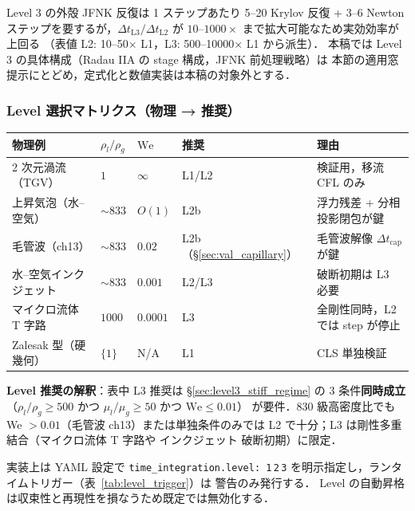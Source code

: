 Level 3 の外殻 JFNK 反復は 1 ステップあたり 5--20 Krylov 反復 + 3--6 Newton
ステップを要するが，$\Delta t_\text{L3}/\Delta t_\text{L2}$ が
$10\text{--}1000\times$ まで拡大可能なため実効効率が上回る
（表値 L2: 10--50$\times$ L1，L3: 500--10000$\times$ L1 から派生）．
本稿では Level 3 の具体構成（Radau IIA の stage 構成，JFNK 前処理戦略）は
本節の適用窓提示にとどめ，定式化と数値実装は本稿の対象外とする．

\subsubsection{Level 選択マトリクス（物理 → 推奨）}
\label{sec:level_physics_matrix}

\begin{center}
\small
\begin{tabular}{@{}lllll@{}}
\hline
物理例 & $\rho_l/\rho_g$ & $\text{We}$ & 推奨 & 理由 \\
\hline
2 次元渦流（TGV）& $1$ & $\infty$ & L1/L2 & 検証用，移流 CFL のみ \\
上昇気泡（水--空気）& $\sim833$ & $O(1)$ & L2b & 浮力残差 + 分相投影閉包が鍵 \\
毛管波（ch13）& $\sim833$ & $0.02$ & L2b（§\ref{sec:val_capillary}）& 毛管波解像 $\Delta t_\text{cap}$ が鍵 \\
水--空気インクジェット & $\sim833$ & $0.001$ & L2/L3 & 破断初期は L3 必要 \\
マイクロ流体 T 字路 & $1000$ & $0.0001$ & L3 & 全剛性同時，L2 では step が停止 \\
Zalesak 型（硬幾何）& $\{1\}$ & N/A & L1 & CLS 単独検証 \\
\hline
\end{tabular}
\end{center}

\noindent\textbf{Level 推奨の解釈}：表中 L3 推奨は \S\ref{sec:level3_stiff_regime} の
3 条件\textbf{同時成立}（$\rho_l/\rho_g\ge 500$ かつ $\mu_l/\mu_g\ge 50$ かつ $\text{We}\le 0.01$）
が要件．830 級高密度比でも We $> 0.01$（毛管波 ch13）または単独条件のみでは
L2 で十分；L3 は剛性多重結合（マイクロ流体 T 字路や インクジェット 破断初期）に限定．

実装上は YAML 設定で
\verb|time_integration.level: 1|\,\verb|2|\,\verb|3|
を明示指定し，ランタイムトリガー（表~\ref{tab:level_trigger}）は
警告のみ発行する．
Level の自動昇格は収束性と再現性を損なうため既定では無効化する．


